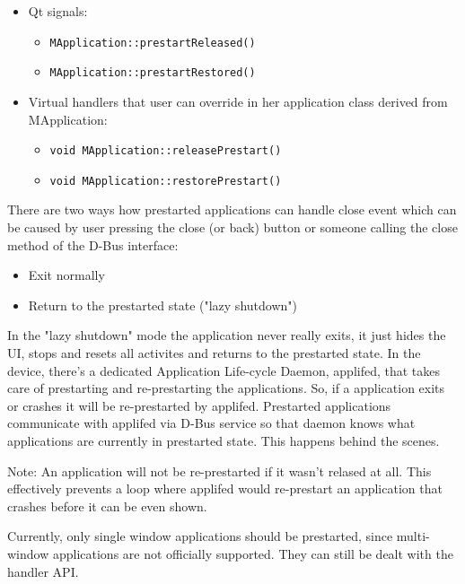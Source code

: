 \documentclass[a4paper]{article}
\begin{document}
\begin{itemize}

\item Qt signals:

\begin{itemize}
\item \texttt{MApplication::prestartReleased()}
\item \texttt{MApplication::prestartRestored()}
\end{itemize}

\item Virtual handlers that user can override in her application class derived from MApplication: 

\begin{itemize}
\item \texttt{void MApplication::releasePrestart()}
\item \texttt{void MApplication::restorePrestart()}
\end{itemize}

\end{itemize}

There are two ways how prestarted applications can handle close event which can be caused 
by user pressing the close (or back) button or someone calling the close method of
the D-Bus interface:

\begin{itemize}

\item Exit normally 
\item Return to the prestarted state ("lazy shutdown")

\end{itemize}

In the "lazy shutdown" mode the application never really exits, it just hides the UI, stops and resets all activites and returns to the prestarted state. In the device, there's a dedicated Application Life-cycle Daemon, applifed, that takes care of prestarting and re-prestarting the applications. So, if a application exits or crashes it will be re-prestarted by applifed. Prestarted applications communicate with applifed via D-Bus service so that daemon knows what applications are currently in prestarted state. This happens behind the scenes. 

Note: An application will not be re-prestarted if it wasn't relased at all. This effectively prevents a loop where
applifed would re-prestart an application that crashes before it can be even shown.

Currently, only single window applications should be prestarted, since multi-window applications
are not officially supported. They can still be dealt with the handler API.
\end{document}
